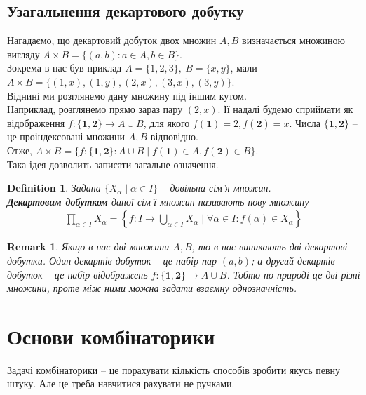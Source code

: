 \documentclass[a4paper, 14pt]{extarticle}
\theoremstyle{theoremdd}
\theoremstyle{theoremdd}
\newtheorem{definition}[theorem]{Definition}
\theoremstyle{theoremdd}
\theoremstyle{theoremdd}
\theoremstyle{theoremdd}
\theoremstyle{theoremdd}
\theoremstyle{theoremdd}
\theoremstyle{theoremdd}
\theoremstyle{theoremdd}
\theoremstyle{theoremdd}
\theoremstyle{theoremdd}
\newtheorem{remark}[theorem]{Remark}
\theoremstyle{theoremdd}
\theoremstyle{theoremdd}
\theoremstyle{theoremdd}
\theoremstyle{theoremdd}
\begin{document}
\subsection{Узагальнення декартового добутку}
Нагадаємо, що декартовий добуток двох множин $A,B$ визначається множиною вигляду $A \times B = \{(a,b) : a \in A, b \in B \}$.\\
Зокрема в нас був приклад $A = \{1,2,3\},\ B = \{x,y\}$, мали\\
$A \times B = \{ (1,x),(1,y),(2,x),(3,x),(3,y)\}$.\\
Віднині ми розглянемо дану множину під іншим кутом. \\
Наприклад, розглянемо прямо зараз пару $(2,x)$. Її надалі будемо сприймати як відображення $f \colon \{\textbf{1},\textbf{2}\} \to A \cup B$, для якого $f(\textbf{1}) = 2, f(\textbf{2}) = x$. Числа $\{\textbf{1}, \textbf{2}\}$ -- це проіндексовані множини $A,B$ відповідно.\\
Отже, $A \times B = \{f \colon \{\textbf{1},\textbf{2}\} \colon A \cup B \mid f(\textbf{1}) \in A, f(\textbf{2}) \in B\}$.\\
Така ідея дозволить записати загальне означення.

\begin{definition}
Задана $\{X_\alpha \mid \alpha \in I\}$ -- довільна сім'я множин.\\
\textbf{Декартовим добутком} даної сім'ї множин називають нову множину
\begin{align*}
\prod_{\alpha \in I} X_\alpha = \left\{ f \colon I \to \bigcup_{\alpha \in I} X_\alpha \mid \forall \alpha \in I: f(\alpha) \in X_\alpha \right\}
\end{align*}
\end{definition}

\begin{remark}
Якщо в нас дві множини $A,B$, то в нас виникають дві декартові добутки. Один декартів добуток -- це набір пар $(a,b)$; а другий декартів добуток -- це набір відображень $f \colon \{\textbf{1}, \textbf{2}\} \to A \cup B$. Тобто по природі це дві різні множини, проте між ними можна задати взаємну однозначність.
\end{remark}
\newpage

\section{Основи комбінаторики}
Задачі комбінаторики -- це порахувати кількість способів зробити якусь певну штуку. Але це треба навчитися рахувати не ручками.
\end{document}
